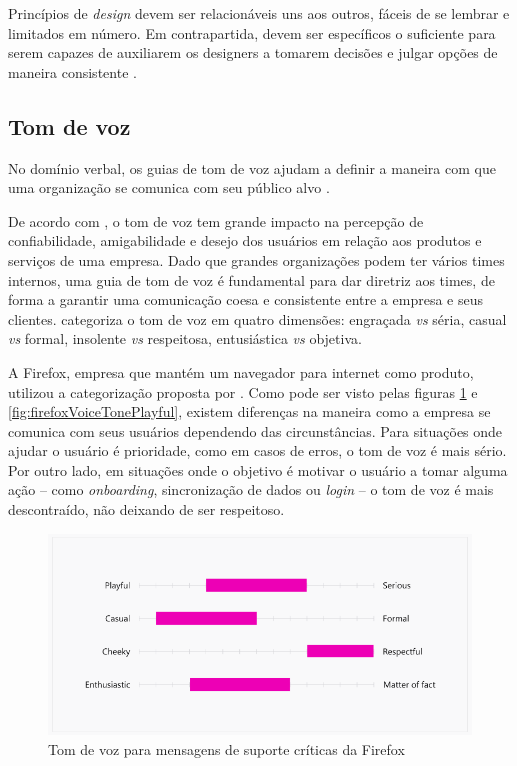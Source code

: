 Princípios de \textit{design} devem ser relacionáveis uns aos outros, fáceis de se lembrar e limitados em número. Em contrapartida, devem ser específicos o suficiente para serem capazes de auxiliarem os designers a tomarem decisões e julgar opções de maneira consistente \cite{kholmatova2017design}.

\subsection{Tom de voz}
\label{subsec:tomVoz}

No domínio verbal, os guias de tom de voz ajudam a definir a maneira com que uma organização se comunica com seu público alvo \cite{ruissalo2018operating}.

De acordo com \cite{impactOfVoiceTone}, o tom de voz tem grande impacto na percepção de confiabilidade, amigabilidade e desejo dos usuários em relação aos produtos e serviços de uma empresa. Dado que grandes organizações podem ter vários times internos, uma guia de tom de voz é fundamental para dar diretriz aos times, de forma a garantir uma comunicação coesa e consistente entre a empresa e seus clientes. \cite{impactOfVoiceTone} categoriza o tom de voz em quatro dimensões: engraçada \textit{vs} séria, casual \textit{vs} formal, insolente \textit{vs} respeitosa, entusiástica \textit{vs} objetiva.

A Firefox, empresa que mantém um navegador para internet como produto, utilizou a categorização proposta por \cite{impactOfVoiceTone}. Como pode ser visto pelas figuras \ref{fig:firefoxVoiceToneSerious} e \ref{fig:firefoxVoiceTonePlayful}, existem diferenças na maneira como a empresa se comunica com seus usuários dependendo das circunstâncias. Para situações onde ajudar o usuário é prioridade, como em casos de erros, o tom de voz é mais sério. Por outro lado, em situações onde o objetivo é motivar o usuário a tomar alguma ação -- como \textit{onboarding}, sincronização de dados ou \textit{login} -- o tom de voz é mais descontraído, não deixando de ser respeitoso.

\begin{figure}
	\includegraphics[width=\linewidth]{./04-figuras/02_referencial_teorico/firefox-tone-voice-01.png}
	\caption{Tom de voz para mensagens de suporte críticas da Firefox}
  \label{fig:firefoxVoiceToneSerious}
\end{figure}

